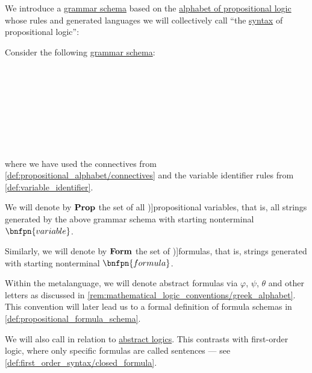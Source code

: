 \begin{definition}\label{def:propositional_syntax}\mimprovised
  We introduce a \hyperref[def:formal_grammar/schema]{grammar schema} based on the \hyperref[def:propositional_alphabet]{alphabet of propositional logic} whose rules and generated languages we will collectively call \enquote{the \hyperref[con:syntax_semantics_duality]{syntax} of propositional logic}:
  \begin{thmenum}
     Consider the following \hyperref[def:formal_grammar/schema]{grammar schema}:
    \begin{bnf*}
                 {} \\
         {\bnftsq{\( \syntop \)} \bnfor \bnftsq{\( \synbot \)}} \\
         {\bnftsq{\( \synneg \)} \bnfsp {}} \\
       {\bnftsq{(} \bnfsp {} \bnfsp {} \bnfsp {} \bnfsp \bnftsq{)}} \\
                  { \bnfor} \\
       \\
       \\
    \end{bnf*}
    where we have used the connectives from \cref{def:propositional_alphabet/connectives} and the variable identifier rules from \cref{def:variable_identifier}.

     We will denote by \( \op*{Prop} \) the set of all \term[ru=пропозициональные переменные (\cite[43]{КолмогоровДрагалин2006Логика})]{propositional variables}, that is, all strings generated by the above grammar schema with starting nonterminal \( \bnfpn{variable} \).

     Similarly, we will denote by \( \op*{Form} \) the set of \term[ru=формула (\cite[43]{КолмогоровДрагалин2006Логика})]{formulas}, that is, strings generated with starting nonterminal \( \bnfpn{formula} \).

    Within the metalanguage, we will denote abstract formulas via \( \varphi \), \( \psi \), \( \theta \) and other letters as discussed in \cref{rem:mathematical_logic_conventions/greek_alphabet}. This convention will later lead us to a formal definition of formula schemas in \cref{def:propositional_formula_schema}.

    We will also call  in relation to \hyperref[def:abstract_logic]{abstract logics}. This contrasts with first-order logic, where only specific formulas are called sentences --- see \cref{def:first_order_syntax/closed_formula}.
  \end{thmenum}
\end{definition}
